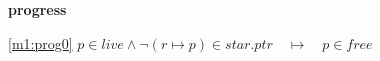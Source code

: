 \textbf{progress}
\begin{block}
\item[ \eqref{m1:prog0} ]{$p \in live \land \neg (r \mapsto p) \in star.ptr  \quad \mapsto\quad p \in free $} %
\end{block}
